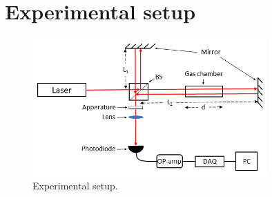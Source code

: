 
\section{Experimental setup}

\begin{figure}[H]
  \centering
  \includegraphics[width=0.8\textwidth]{Exp_setup.png}
  \caption{Experimental setup. }
  \label{fig:experimentalSetup}
\end{figure}
